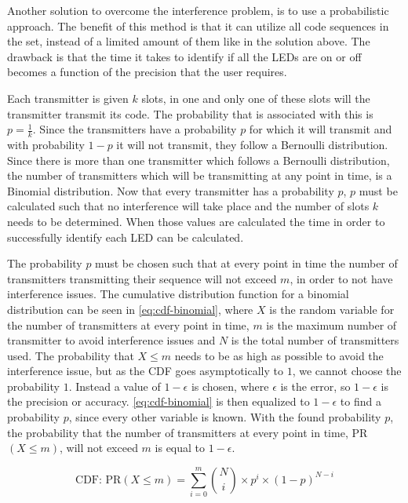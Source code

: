 Another solution to overcome the interference problem, is to use a probabilistic approach.
The benefit of this method is that it can utilize all code sequences in the set, instead of a limited amount of them like in the solution above.
The drawback is that the time it takes to identify if all the LEDs are on or off becomes a function of the precision that the user requires.

Each transmitter is given $k$ slots, in one and only one of these slots will the transmitter transmit its code.
The probability that is associated with this is $p = \frac{1}{k}$.
Since the transmitters have a probability $p$ for which it will transmit and with probability $1 - p$ it will not transmit, they follow a Bernoulli distribution.
Since there is more than one transmitter which follows a Bernoulli distribution, the number of transmitters which will be transmitting at any point in time, is a Binomial distribution.
Now that every transmitter has a probability $p$, $p$ must be calculated such that no interference will take place and the number of slots $k$ needs to be determined.
When those values are calculated the time in order to successfully identify each LED can be calculated.




The probability $p$ must be chosen such that at every point in time the number of transmitters transmitting their sequence will not exceed $m$, in order to not have interference issues.
The cumulative distribution function for a binomial distribution can be seen in \autoref{eq:cdf-binomial}, where $X$ is the random variable for the number of transmitters at every point in time, $m$ is the maximum number of transmitter to avoid interference issues and $N$ is the total number of transmitters used.
The probability that $X \le m$ needs to be as high as possible to avoid the interference issue, but as the CDF goes asymptotically to $1$, we cannot choose the probability $1$.
Instead a value of $1 - \epsilon$ is chosen, where $\epsilon$ is the error, so $1 - \epsilon$ is the precision or accuracy.
\autoref{eq:cdf-binomial} is then equalized to $1 - \epsilon$ to find a probability $p$, since every other variable is known.
With the found probability $p$, the probability that the number of transmitters at every point in time, PR$(X \le m)$, will not exceed $m$ is equal to $1 - \epsilon$.

\begin{equation}
	\label{eq:cdf-binomial}
	\text{CDF:  PR}(X \le m) = \displaystyle\sum_{i=0}^{m} \binom Ni \times p^i \times (1 - p)^{N-i}
\end{equation}


